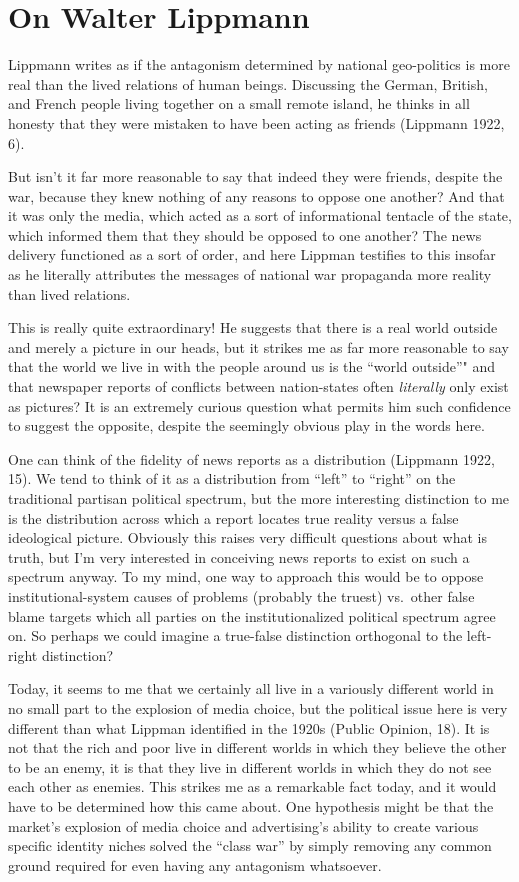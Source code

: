 \documentclass[12pt,book]{article}
\begin{document}
\section{On Walter Lippmann}\label{on-walter-lippmann}

Lippmann writes as if the antagonism determined by national geo-politics
is more real than the lived relations of human beings. Discussing the
German, British, and French people living together on a small remote
island, he thinks in all honesty that they were mistaken to have been
acting as friends (Lippmann 1922, 6).

But isn't it far more reasonable to say that indeed they were friends,
despite the war, because they knew nothing of any reasons to oppose one
another? And that it was only the media, which acted as a sort of
informational tentacle of the state, which informed them that they
should be opposed to one another? The news delivery functioned as a sort
of order, and here Lippman testifies to this insofar as he literally
attributes the messages of national war propaganda more reality than
lived relations.

This is really quite extraordinary! He suggests that there is a real
world outside and merely a picture in our heads, but it strikes me as
far more reasonable to say that the world we live in with the people
around us is the ``world outside''" and that newspaper reports of
conflicts between nation-states often \emph{literally} only exist as
pictures? It is an extremely curious question what permits him such
confidence to suggest the opposite, despite the seemingly obvious play
in the words here.

One can think of the fidelity of news reports as a distribution
(Lippmann 1922, 15). We tend to think of it as a distribution from
``left'' to ``right'' on the traditional partisan political spectrum,
but the more interesting distinction to me is the distribution across
which a report locates true reality versus a false ideological picture.
Obviously this raises very difficult questions about what is truth, but
I'm very interested in conceiving news reports to exist on such a
spectrum anyway. To my mind, one way to approach this would be to oppose
institutional-system causes of problems (probably the truest) vs.~other
false blame targets which all parties on the institutionalized political
spectrum agree on. So perhaps we could imagine a true-false distinction
orthogonal to the left-right distinction?

Today, it seems to me that we certainly all live in a variously
different world in no small part to the explosion of media choice, but
the political issue here is very different than what Lippman identified
in the 1920s (Public Opinion, 18). It is not that the rich and poor live
in different worlds in which they believe the other to be an enemy, it
is that they live in different worlds in which they do not see each
other as enemies. This strikes me as a remarkable fact today, and it
would have to be determined how this came about. One hypothesis might be
that the market's explosion of media choice and advertising's ability to
create various specific identity niches solved the ``class war'' by
simply removing any common ground required for even having any
antagonism whatsoever.
\end{document}
